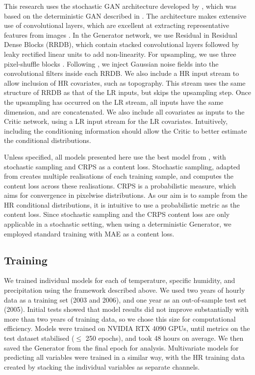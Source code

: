 \documentclass{ametsocV6.1}
\begin{document}
This research uses the stochastic GAN architecture developed by \citet{daust2024capturing}, which was based on the deterministic GAN described in \citet{annau2023algorithmic}. The architecture makes extensive use of convolutional layers, which are excellent at extracting representative features from images \citep{li2021survey}. In the Generator network, we use Residual in Residual Dense Blocks (RRDB), which contain stacked convolutional layers followed by leaky rectified linear units to add non-linearity. For upsampling, we use three pixel-shuffle blocks \citep{shi2016real}. Following \citet{daust2024capturing}, we inject Gaussian noise fields into the convolutional filters inside each RRDB. We also include a HR input stream to allow inclusion of HR covariates, such as topography. This stream uses the same structure of RRDB as that of the LR inputs, but skips the upsampling step. Once the upsampling has occurred on the LR stream, all inputs have the same dimension, and are concatenated. We also include all covariates as inputs to the Critic network, using a LR input stream for the LR covariates. Intuitively, including the conditioning information should allow the Critic to better estimate the conditional distributions. 

Unless specified, all models presented here use the best model from \citet{daust2024capturing}, with stochastic sampling and CRPS as a content loss. Stochastic sampling, adapted from \citet{harris2022generative} creates multiple realisations of each training sample, and computes the content loss across these realisations. CRPS is a probabilistic measure, which aims for convergence in pixelwise distributions. As our aim is to sample from the HR conditional distributions, it is intuitive to use a probabilistic metric as the content loss. Since stochastic sampling and the CRPS content loss are only applicable in a stochastic setting, when using a deterministic Generator, we employed standard training with MAE as a content loss. 

\subsection{Training}
We trained individual models for each of temperature, specific humidity, and precipitation using the framework described above. We used two years of hourly data as a training set (2003 and 2006), and one year as an out-of-sample test set (2005). Initial tests showed that model results did not improve substantially with more than two years of training data, so we chose this size for computational efficiency. Models were trained on NVIDIA RTX 4090 GPUs, until metrics on the test dataset stabilised ($\leq$ 250 epochs), and took 48 hours on average. We then saved the Generator from the final epoch for analysis. Multivariate models for predicting all variables were trained in a similar way, with the HR training data created by stacking the individual variables as separate channels. 
\end{document}
